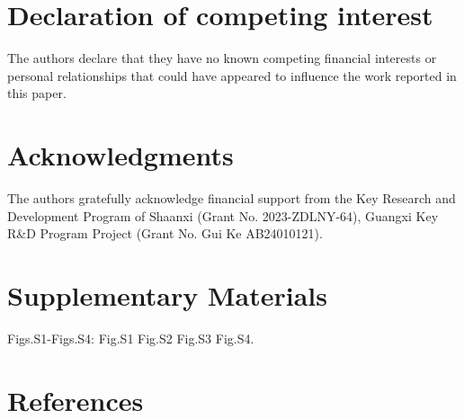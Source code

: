 \documentclass[
]{article}
\begin{document}
\hypertarget{declaration-of-competing-interest}{%
\section{Declaration of competing
interest}\label{declaration-of-competing-interest}}

The authors declare that they have no known competing financial
interests or personal relationships that could have appeared to
influence the work reported in this paper.

\hypertarget{acknowledgments}{%
\section{Acknowledgments}\label{acknowledgments}}

The authors gratefully acknowledge financial support from the Key
Research and Development Program of Shaanxi (Grant No. 2023-ZDLNY-64),
Guangxi Key R\&D Program Project (Grant No. Gui Ke AB24010121).

\hypertarget{supplementary-materials}{%
\section{Supplementary Materials}\label{supplementary-materials}}

Figs.S1-Figs.S4: Fig.S1 Fig.S2 Fig.S3 Fig.S4.

\hypertarget{references}{%
\section{References}\label{references}}
\end{document}
